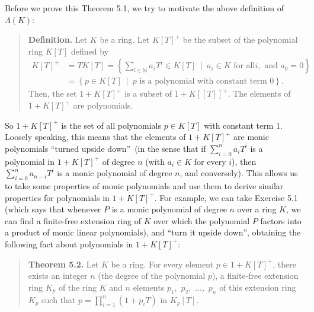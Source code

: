 \documentclass[numbers=enddot,12pt,final,onecolumn,notitlepage]{scrartcl}%
\begin{document}
Before we prove this Theorem 5.1, we try to motivate the above definition of
$\Lambda\left(  K\right)  $:

\begin{quote}
\textbf{Definition.} Let $K$ be a ring. Let $K\left[  T\right]  ^{+}$ be the
subset of the polynomial ring $K\left[  T\right]  $ defined by%
\begin{align*}
K\left[  T\right]  ^{+}  &  =TK\left[  T\right]  =\left\{  \sum_{i\in
\mathbb{N}}a_{i}T^{i}\in K\left[  T\right]  \ \mid\ a_{i}\in K\text{ for all
}i,\text{ and }a_{0}=0\right\} \\
&  =\left\{  p\in K\left[  T\right]  \ \mid\ p\text{ is a polynomial with
constant term }0\right\}  .
\end{align*}
Then, the set $1+K\left[  T\right]  ^{+}$ is a subset of $1+K\left[  \left[
T\right]  \right]  ^{+}.$ The elements of $1+K\left[  T\right]  ^{+}$ are polynomials.
\end{quote}

So $1+K\left[  T\right]  ^{+}$ is the set of all polynomials $p\in K\left[
T\right]  $ with constant term $1$. Loosely speaking, this means that the
elements of $1+K\left[  T\right]  ^{+}$ are monic polynomials
\textquotedblleft turned upside down\textquotedblright\ (in the sense that if
$\sum\limits_{i=0}^{n}a_{i}T^{i}$ is a polynomial in $1+K\left[  T\right]
^{+}$ of degree $n$ (with $a_{i}\in K$ for every $i$), then $\sum
\limits_{i=0}^{n}a_{n-i}T^{i}$ is a monic polynomial of degree $n$, and
conversely). This allows us to take some properties of monic polynomials and
use them to derive similar properties for polynomials in $1+K\left[  T\right]
^{+}$. For example, we can take Exercise 5.1 (which says that whenever $P$ is
a monic polynomial of degree $n$ over a ring $K$, we can find a finite-free
extension ring of $K$ over which the polynomial $P$ factors into a product of
monic linear polynomials), and \textquotedblleft turn it upside
down\textquotedblright, obtaining the following fact about polynomials in
$1+K\left[  T\right]  ^{+}$:

\begin{quote}
\textbf{Theorem 5.2.} Let $K$ be a ring. For every element $p\in1+K\left[
T\right]  ^{+}$, there exists an integer $n$ (the degree of the polynomial
$p$), a finite-free extension ring $K_{p}$ of the ring $K$ and $n$ elements
$p_{1},$ $p_{2},$ $...,$ $p_{n}$ of this extension ring $K_{p}$ such that
$p=\prod\limits_{i=1}^{n}\left(  1+p_{i}T\right)  $ in $K_{p}\left[  T\right]
$.
\end{quote}
\end{document}
